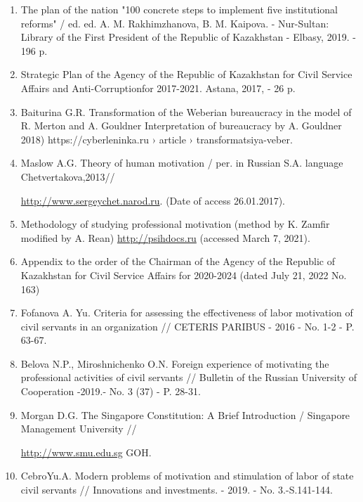 \begin{enumerate}
\item
The plan of the nation "100 concrete steps to implement five
institutional reforms" / ed. ed. A. M. Rakhimzhanova, B. M. Kaipova. -
Nur-Sultan: Library of the First President of the Republic of Kazakhstan
- Elbasy, 2019. - 196 p.

\item
Strategic Plan of the Agency of the Republic of Kazakhstan for Civil
Service Affairs and Anti-Corruptionfor 2017-2021. Astana, 2017, - 26 p.

\item
Baiturina G.R. Transformation of the Weberian bureaucracy in the
model of R. Merton and A. Gouldner Interpretation of bureaucracy by A.
Gouldner 2018) https://cyberleninka.ru › article ›
transformatsiya-veber.

\item
Maslow A.G. Theory of human motivation / per. in Russian S.A.
language Chetvertakova,2013//

\href{http://www.sergeychet.narod.ru/bibl\_psy/hummotiv1943.htm}{http://www.sergeychet.narod.ru}. (Date of
access 26.01.2017).

\item
Methodology of studying professional motivation (method by K. Zamfir modified by A. Rean) \href{http://psihdocs.ru/metodika-izuchenie-motivacii-professionalnoj-deyatelnosti-metodika-k-zamfira-modificirovannaya-a-rean/}{http://psihdocs.ru} (accessed March 7, 2021).

\item
Appendix to the order of the Chairman of the Agency of the Republic
of Kazakhstan for Civil Service Affairs for 2020-2024 (dated July 21,
2022 No. 163)

\item
Fofanova A. Yu. Criteria for assessing the effectiveness of labor
motivation of civil servants in an organization // CETERIS PARIBUS -
2016 - No. 1-2 - P. 63-67.

\item
Belova N.P., Miroshnichenko O.N. Foreign experience of motivating
the professional activities of civil servants // Bulletin of the Russian
University of Cooperation -2019.- No. 3 (37) - P. 28-31.

\item
Morgan D.G. The Singapore Constitution: A Brief Introduction /
Singapore Management University //

\href{http://www.smu.edu.sg/faculty/profile/9491/Jeremy-}{http://www.smu.edu.sg}
GOH.

\item
CebroYu.A. Modern problems of motivation and stimulation of labor of
state civil servants // Innovations and investments. - 2019. - No.
3.-S.141-144.
\end{enumerate}

